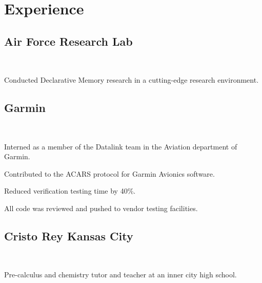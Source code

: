 \documentclass[letterpaper]{deedy-resume} %
\begin{document}
\begin{minipage}[t]{0.66\textwidth}
\sectionspace %


\section{Experience}

\subsection{Air Force Research Lab}
 \hfill {} \\
\smallsectionspace
\vspace{\topsep} %
\begin{tightitemize}
\item Conducted Declarative Memory research in a cutting-edge research environment.
\end{tightitemize}

\sectionspace %


\subsection{Garmin}
 \hfill {} \\
\begin{tightitemize}
\item Interned as a member of the Datalink team in the Aviation department of Garmin. 
\item Contributed to the ACARS protocol for Garmin Avionics software.
\item Reduced verification testing time by 40\%.
\item All code was reviewed and pushed to vendor testing facilities.
\end{tightitemize}

\sectionspace %


\subsection{Cristo Rey Kansas City}
 \hfill {} \\
\begin{tightitemize}
\item Pre-calculus and chemistry tutor and teacher at an inner city high school. 
\end{tightitemize}


\end{minipage}
\end{document}
